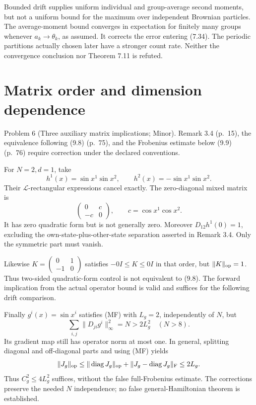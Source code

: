 \documentclass[10pt]{article}
\begin{document}
Bounded drift supplies uniform individual and group-average second moments, but not a uniform bound for the maximum over independent Brownian particles. The average-moment bound converges in expectation for finitely many groups whenever \(a_k\to\theta_k\), as assumed. It corrects the error entering (7.34). The periodic partitions actually chosen later have a stronger count rate. Neither the convergence conclusion nor Theorem 7.11 is refuted.\par
\section*{Matrix order and dimension dependence}
Problem 6 (Three auxiliary matrix implications; Minor).  Remark 3.4 (p. 15), the equivalence following (9.8) (p. 75), and the Frobenius estimate below (9.9) (p. 76) require correction under the declared conventions.\par
For \(N=2,d=1\), take \[h^1(x)=\sin x^1\sin x^2,\qquad h^2(x)=-\sin x^1\sin x^2.\] Their \(\mathcal L\)-rectangular expressions cancel exactly. The zero-diagonal mixed matrix is \[\begin{pmatrix}0&c\\-c&0\end{pmatrix},\qquad c=\cos x^1\cos x^2.\] It has zero quadratic form but is not generally zero. Moreover \(D_{12}h^1(0)=1\), excluding the own-state-plus-other-state separation asserted in Remark 3.4. Only the symmetric part must vanish.\par
Likewise \(K=\left(\begin{smallmatrix}0&1\\-1&0\end{smallmatrix}\right)\) satisfies \(-0I\le K\le0I\) in that order, but \(\|K\|_{\rm op}=1\). Thus two-sided quadratic-form control is not equivalent to (9.8). The forward implication from the actual operator bound is valid and suffices for the following drift comparison.\par
Finally \(g^i(x)=\sin x^i\) satisfies (MF) with \(L_g=2\), independently of \(N\), but \[\sum_{i,j}\|D_{ji}g^i\|_\infty^2=N>2L_g^2\quad(N>8).\] Its gradient map still has operator norm at most one. In general, splitting diagonal and off-diagonal parts and using (MF) yields \[\|J_g\|_{\rm op}\le\|\operatorname{diag}J_g\|_{\rm op}
+\|J_g-\operatorname{diag}J_g\|_{\rm F}\le2L_g.\] Thus \(C_g^2\le4L_g^2\) suffices, without the false full-Frobenius estimate. The corrections preserve the needed \(N\) independence; no false general-Hamiltonian theorem is established.\par
\end{document}
